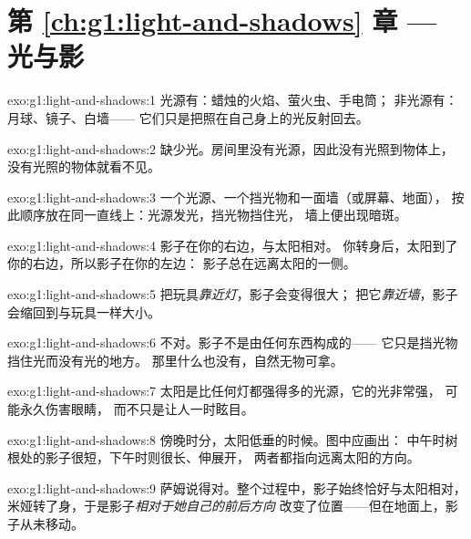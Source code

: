 \section*{第 \ref{ch:g1:light-and-shadows} 章 --- 光与影}

\begin{solution}{exo:g1:light-and-shadows:1}
光源有：蜡烛的火焰、萤火虫、手电筒；
非光源有：月球、镜子、白墙——
它们只是把照在自己身上的光反射回去。
\end{solution}

\begin{solution}{exo:g1:light-and-shadows:2}
缺少光。房间里没有光源，因此没有光照到物体上，
没有光照的物体就看不见。
\end{solution}

\begin{solution}{exo:g1:light-and-shadows:3}
一个光源、一个挡光物和一面墙（或屏幕、地面），
按此顺序放在同一直线上：光源发光，挡光物挡住光，
墙上便出现暗斑。
\end{solution}

\begin{solution}{exo:g1:light-and-shadows:4}
影子在你的右边，与太阳相对。
你转身后，太阳到了你的右边，所以影子在你的左边：
影子总在远离太阳的一侧。
\end{solution}

\begin{solution}{exo:g1:light-and-shadows:5}
把玩具\emph{靠近灯}，影子会变得很大；
把它\emph{靠近墙}，影子会缩回到与玩具一样大小。
\end{solution}

\begin{solution}{exo:g1:light-and-shadows:6}
不对。影子不是由任何东西构成的——
它只是挡光物挡住光而没有光的地方。
那里什么也没有，自然无物可拿。
\end{solution}

\begin{solution}{exo:g1:light-and-shadows:7}
太阳是比任何灯都强得多的光源，它的光非常强，
可能永久伤害眼睛，
而不只是让人一时眩目。
\end{solution}

\begin{solution}{exo:g1:light-and-shadows:8}
傍晚时分，太阳低垂的时候。图中应画出：
中午时树根处的影子很短，下午时则很长、伸展开，
两者都指向远离太阳的方向。
\end{solution}

\begin{solution}{exo:g1:light-and-shadows:9}
萨姆说得对。整个过程中，影子始终恰好与太阳相对，
米娅转了身，于是影子\emph{相对于她自己的前后方向}
改变了位置——但在地面上，影子从未移动。
\end{solution}
